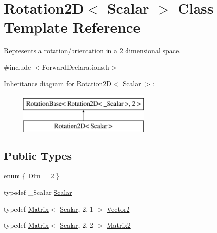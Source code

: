 \hypertarget{class_rotation2_d}{\section{Rotation2\-D$<$ Scalar $>$ Class Template Reference}
\label{class_rotation2_d}
}


Represents a rotation/orientation in a 2 dimensional space.  




{\ttfamily \#include $<$Forward\-Declarations.\-h$>$}

Inheritance diagram for Rotation2\-D$<$ Scalar $>$\-:\begin{figure}[H]
\begin{center}
\leavevmode
\includegraphics[height=2.000000cm]{class_rotation2_d}
\end{center}
\end{figure}
\subsection*{Public Types}
\begin{DoxyCompactItemize}
\item 
enum \{ \hyperlink{class_rotation2_d_a436a9a68dc8598228f7baffbadfd8ae4a8747fba98b24f30a84e5437e3157b4b6}{Dim} = 2
 \}
\item 
typedef \-\_\-\-Scalar \hyperlink{class_rotation2_d_a9fe0daf4c508069bf7c4b5705f89dc0c}{Scalar}
\item 
typedef \hyperlink{class_matrix}{Matrix}$<$ \hyperlink{class_rotation2_d_a9fe0daf4c508069bf7c4b5705f89dc0c}{Scalar}, 2, 1 $>$ \hyperlink{class_rotation2_d_abdc2e1016e3191a88dc42877fd5a50f0}{Vector2}
\item 
typedef \hyperlink{class_matrix}{Matrix}$<$ \hyperlink{class_rotation2_d_a9fe0daf4c508069bf7c4b5705f89dc0c}{Scalar}, 2, 2 $>$ \hyperlink{class_rotation2_d_a1a1acef614c61a56878f65e6b58f4a77}{Matrix2}
\end{DoxyCompactItemize}
